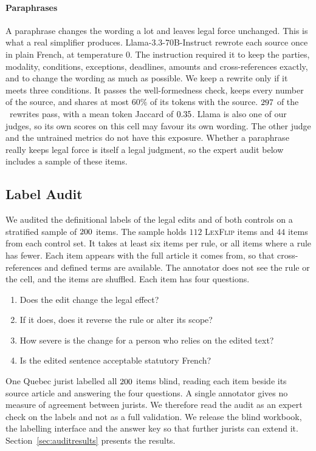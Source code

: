 \documentclass{BVP_JCLLT}
\begin{document}
{\paragraph{Paraphrases}
A paraphrase changes the wording a lot and leaves legal force unchanged. This is
what a real simplifier produces. Llama-3.3-70B-Instruct rewrote each source once
in plain French, at temperature $0$. The instruction required it to keep the
parties, modality, conditions, exceptions, deadlines, amounts and
cross-references exactly, and to change the wording as much as possible. We keep
a rewrite only if it meets three conditions. It passes the well-formedness
check, keeps every number of the source, and shares at most $60\%$ of its
tokens with the source. $297$ of the
\numedits\ rewrites pass, with a mean token Jaccard of $0.35$. Llama is
also one of our judges, so its own scores on this cell may favour its own
wording. The other judge and the untrained metrics do not have this exposure.
Whether a paraphrase really keeps legal force is itself a legal judgment, so the
expert audit below includes a sample of these items.

\subsection{Label Audit}\label{sec:audit}
We audited the definitional labels of the legal edits and of both
controls on a stratified sample of $200$ items. The sample holds $112$
\textsc{LexFlip} items and $44$ items from each control set. It takes at least
six items per rule, or all items where a rule has fewer. Each item appears with the full article it
comes from, so that cross-references and defined terms are available. The
annotator does not see the rule or the cell, and the items are shuffled. Each
item has four questions.

\begin{enumerate}\itemsep1pt
\item Does the edit change the legal effect?
\item If it does, does it reverse the rule or alter its scope?
\item How severe is the change for a person who relies on the edited text?
\item Is the edited sentence acceptable statutory French?
\end{enumerate}

One Quebec jurist labelled all $200$ items blind, reading each item beside
its source article and answering the four questions. A single annotator gives no
measure of agreement between jurists. We therefore read the audit as an expert
check on the labels and not as a full validation. We release the blind workbook, the
labelling interface and the answer key so that further jurists can extend it.
Section~\ref{sec:auditresults} presents the results.}
\end{document}

